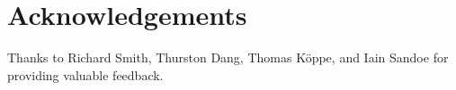 
\section*{Acknowledgements}
Thanks to  Richard Smith, Thurston Dang, Thomas K\"{o}ppe, and Iain Sandoe for providing valuable feedback.


\pagebreak
\renewcommand{\bibname}{References}  %






